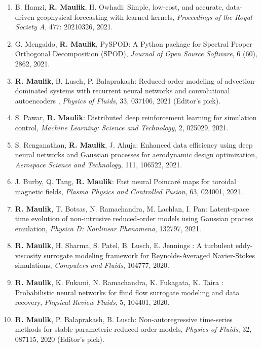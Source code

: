 \documentclass[letterpaper]{article}
\begin{document}
\begin{enumerate}
\item B. Hamzi, \textbf{R. Maulik}, H. Owhadi: Simple, low-cost, and accurate, data-driven geophysical forecasting with learned kernels, {\it Proceedings of the Royal Society A}, 477: 20210326, 2021.

\item G. Mengaldo, \textbf{R. Maulik}, PySPOD: A Python package for Spectral Proper Orthogonal Decomposition (SPOD), {\it Journal of Open Source Software}, 6 (60), 2862, 2021.

\item \textbf{R. Maulik}, B. Lusch, P. Balaprakash: Reduced-order modeling of advection-dominated systems with recurrent neural networks and convolutional autoencoders , {\it Physics of Fluids}, 33, 037106, 2021 (Editor's pick).

\item S. Pawar, \textbf{R. Maulik}: Distributed deep reinforcement learning for simulation control, {\it Machine Learning: Science and Technology}, 2, 025029, 2021.

\item S. Renganathan, \textbf{R. Maulik}, J. Ahuja: Enhanced data efficiency using deep neural networks and Gaussian processes for aerodynamic design optimization, {\it Aerospace Science and Technology}, 111, 106522, 2021.

\item J. Burby, Q. Tang, \textbf{R. Maulik}: Fast neural Poincar\'{e} maps for toroidal magnetic fields, {\it Plasma Physics and Controlled Fusion}, 63, 024001, 2021.

\item \textbf{R. Maulik}, T. Botsas, N. Ramachandra, M. Lachlan, I. Pan: Latent-space time evolution of non-intrusive reduced-order models using Gaussian process emulation, {\it Physica D: Nonlinear Phenomena}, 132797, 2021. 

\item \textbf{R. Maulik}, H. Sharma, S. Patel, B. Lusch, E. Jennings : A turbulent eddy-viscosity surrogate modeling framework for Reynolds-Averaged Navier-Stokes simulations, {\it Computers and Fluids}, 104777, 2020. 

\item \textbf{R. Maulik}, K. Fukami, N. Ramachandra, K. Fukagata, K. Taira : Probabilistic neural networks for fluid flow surrogate modeling and data recovery, {\it Physical Review Fluids}, 5, 104401, 2020. 

\item \textbf{R. Maulik}, P. Balaprakash, B. Lusch: Non-autoregressive time-series methods for stable parameteric reduced-order models, {\it Physics of Fluids}, 32, 087115, 2020 (Editor's pick). 


\end{enumerate}
\end{document}
